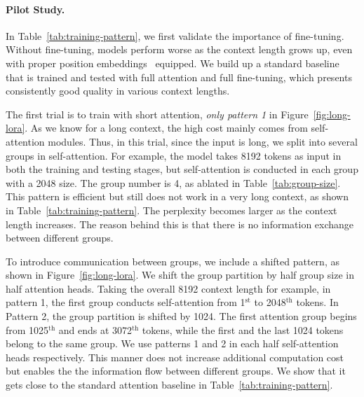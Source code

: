 \documentclass{article} %
\begin{document}
\paragraph{Pilot Study.}
In Table~\ref{tab:training-pattern}, we first validate the importance of fine-tuning. Without fine-tuning, models perform worse as the context length grows up, even with proper position embeddings~\citep{position-interpolation, ntk-pe} equipped.
We build up a standard baseline that is trained and tested with full attention and full fine-tuning, which presents consistently good quality in various context lengths.

The first trial is to train with short attention, \textit{only pattern 1} in Figure~\ref{fig:long-lora}. As we know for a long context, the high cost mainly comes from self-attention modules. Thus, in this trial, since the input is long, we split into several groups in self-attention. For example, the model takes 8192 tokens as input in both the training and testing stages, but self-attention is conducted in each group with a 2048 size. The group number is 4, as ablated in Table~\ref{tab:group-size}. This pattern is efficient but still does not work in a very long context, as shown in Table~\ref{tab:training-pattern}. The perplexity becomes larger as the context length increases. The reason behind this is that there is no information exchange between different groups.

To introduce communication between groups, we include a shifted pattern, as shown in Figure~\ref{fig:long-lora}. We shift the group partition by half group size in half attention heads. Taking the overall 8192 context length for example, in pattern 1, the first group conducts self-attention from 1$^{\textrm{st}}$ to 2048$^{\textrm{th}}$ tokens. In Pattern 2, the group partition is shifted by 1024. The first attention group begins from 1025$^{\textrm{th}}$ and ends at 3072$^{\textrm{th}}$ tokens, while the first and the last 1024 tokens belong to the same group. We use patterns 1 and 2 in each half self-attention heads respectively. This manner does not increase additional computation cost but enables the the information flow between different groups. We show that it gets close to the standard attention baseline in Table~\ref{tab:training-pattern}.
\end{document}
